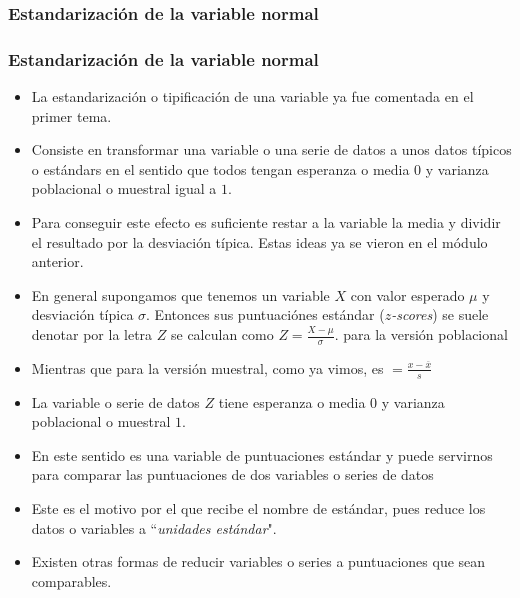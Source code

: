 \subsubsection{Estandarización de la variable normal}
\begin{frame}
\frametitle{Estandarización de la variable normal}

\begin{itemize}
\item La estandarización o tipificación de una variable ya fue comentada en el primer tema.
\item  Consiste en transformar una variable o una serie de datos a unos datos típicos o estándars en el sentido que todos tengan esperanza o media $0$ y varianza poblacional o muestral igual a $1$. 
\item Para conseguir este efecto es suficiente restar a la variable la media y dividir el resultado por la desviación típica. Estas ideas ya se vieron en el módulo anterior.
\end{itemize}

\end{frame}
\begin{frame}
\begin{itemize}
\item En general supongamos que tenemos un variable $X$ con valor esperado $\mu$ y desviación típica $\sigma$. Entonces sus puntuaciónes estándar (\textit{$z$-scores}) se suele denotar por la letra $Z$ se calculan como $Z=\frac{X-\mu}{\sigma}$.
para la versión  poblacional
\item Mientras que para la versión muestral, como ya vimos, es $=\frac{x-\overline{x}}{s}$
\end{itemize}
\end{frame}

\begin{frame}
\begin{itemize}
\item La variable o serie de datos $Z$ tiene esperanza o media $0$ y varianza poblacional o muestral $1$. 
\item En este sentido es una variable de puntuaciones estándar y puede servirnos para comparar las puntuaciones de dos variables o series de datos
\item  Este es el motivo por el que recibe el nombre de estándar, pues reduce los datos o variables a ``\textsl{unidades estándar}". \item Existen otras  formas de reducir variables o series a puntuaciones que sean comparables. 
\end{itemize}
\end{frame}

